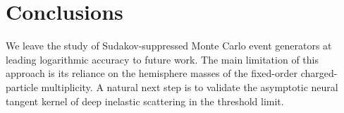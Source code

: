 \section{Conclusions}\label{sec:conclusions}

We leave the study of Sudakov-suppressed Monte Carlo event generators at
leading logarithmic accuracy to future work. The main limitation of this
approach is its reliance on the hemisphere masses of the fixed-order
charged-particle multiplicity. A natural next step is to validate the
asymptotic neural tangent kernel of deep inelastic scattering in the
threshold limit.

